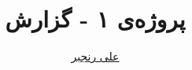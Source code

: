 \documentclass[logo=images/logo.png]{tehranReport}
\title{پروژه‌ی ۱ - گزارش}
\author{\href{mailto:ranjbar.ali@ut.ac.ir?subject=[OS\%20S99 L1]\%20}{علی رنجبر}}
\begin{document}
	\maketitlepage
	
	
	
\end{document}

